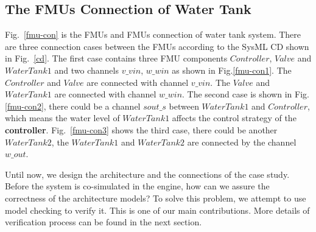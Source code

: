 \subsection{The FMUs Connection of Water Tank}
Fig.~\ref{fmu-con} is the FMUs and FMUs connection of water tank system. There are three connection cases between the FMUs according to the SysML CD shown in Fig.~\ref{cd}. The first case contains three FMU components $Controller$, $Valve$ and $WaterTank1$ and two channels $v \_ vin$, $w \_ win$ as shown in Fig.\ref{fmu-con1}. The $Controller$ and $Valve$ are connected with channel $v \_ vin$. The $Valve$ and $WaterTank1$ are connected with channel $w \_ win$. The second case is shown in Fig.\ref{fmu-con2}, there could be a channel $sout \_ s$ between $WaterTank1$ and $Controller$, which means the water level of $WaterTank1$ affects the control strategy of the \textbf{controller}. Fig.~\ref{fmu-con3} shows the third case, there could be another $WaterTank2$, the $WaterTank1$ and $WaterTank2$ are connected by the channel $w \_ out$. 
\begin{figure}[htbp]
\end{figure}

Until now, we design the architecture and the connections of the case study. Before the system is co-simulated in the engine, how can we assure the correctness of the architecture models? To solve this problem, we attempt to use model checking to verify it. This is one of our main contributions. More details of verification process can be found in the next section.